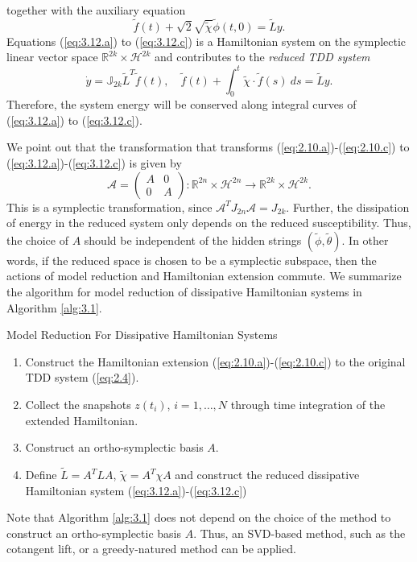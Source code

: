 together with the auxiliary equation
\begin{equation} \label{eq:3.13}
	\tilde f(t) + \sqrt{2} \sqrt{\tilde \chi} \tilde \phi(t,0) = \tilde L y.
\end{equation}
Equations (\ref{eq:3.12.a}) to (\ref{eq:3.12.c}) is a Hamiltonian system on the symplectic linear vector space $\mathbb R^{2k} \times \mathcal H^{2k}$ and contributes to the \emph{reduced TDD system}
\begin{equation}
	\dot {y} = \mathbb J_{2k} \tilde L^T \tilde f(t), \quad \tilde f(t) + \int_0^t \tilde \chi\cdot \tilde f(s)\ ds = \tilde L y.
\end{equation}
Therefore, the system energy will be conserved along integral curves of (\ref{eq:3.12.a}) to (\ref{eq:3.12.c}).

We point out that the transformation that transforms (\ref{eq:2.10.a})-(\ref{eq:2.10.c}) to (\ref{eq:3.12.a})-(\ref{eq:3.12.c}) is given by
\begin{equation}
	\mathcal A = \begin{pmatrix}
		A& 0 \\
		0& A
	\end{pmatrix} : \mathbb R^{2n} \times \mathcal H^{2n} \to \mathbb R^{2k} \times \mathcal H^{2k}.
\end{equation}
This is a symplectic transformation, since $\mathcal A^T J_{2n} \mathcal A = J_{2k}$. Further, the dissipation of energy in the reduced system only depends on the reduced susceptibility. Thus, the choice of $A$ should be independent of the hidden strings $(\tilde \phi, \tilde \theta)$. In other words, if the reduced space is chosen to be a symplectic subspace, then the actions of model reduction and Hamiltonian extension commute. We summarize the algorithm for model reduction of dissipative Hamiltonian systems in Algorithm \ref{alg:3.1}.

\begin{algorithm}
\caption{Model Reduction For Dissipative Hamiltonian Systems} \label{alg:3.1}
\begin{enumerate}
	\item Construct the Hamiltonian extension (\ref{eq:2.10.a})-(\ref{eq:2.10.c}) to the original TDD system (\ref{eq:2.4}).
	\item Collect the snapshots $z(t_i)$, $i=1,\dots,N$ through time integration of the extended Hamiltonian.
	\item Construct an ortho-symplectic basis $A$.
	\item Define $\tilde L = A^T L A$, $\tilde \chi = A^T \chi A$ and construct the reduced dissipative Hamiltonian system (\ref{eq:3.12.a})-(\ref{eq:3.12.c})
\end{enumerate}
\end{algorithm}

Note that Algorithm \ref{alg:3.1} does not depend on the choice of the method to construct an ortho-symplectic basis $A$. Thus, an SVD-based method, such as the cotangent lift, or a greedy-natured method can be applied.
